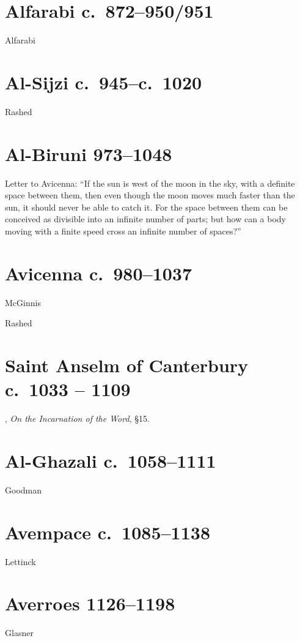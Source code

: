 \documentclass{article}
\begin{document}
\section{Alfarabi c.~872--950/951}
Alfarabi \cite[pp.~101--111]{alfarabi}


\section{Al-Sijzi c.~945--c.~1020}
Rashed \cite{rashed2000}

\section{Al-Biruni 973--1048}
Letter to Avicenna: ``If the sun is west of the moon in the sky, with a definite space between
them, then even though the moon moves much faster than the sun, it should never be able to catch it.
For the space between them can be conceived as divisible into an infinite number of parts; but how
can a body moving with a finite speed cross an infinite number of spaces?'' \cite[p.~820]{selin}

\section{Avicenna c.~980--1037}
McGinnis \cite{mcginnis}

Rashed \cite{rashed}



\section{Saint Anselm of Canterbury c.~1033 -- 1109},
{\em On the Incarnation of the Word}, \S 15.


\section{Al-Ghazali c.~1058--1111}
Goodman \cite{goodman}


\section{Avempace c.~1085--1138}
Lettinck \cite{lettinck}



\section{Averroes 1126--1198}
Glasner \cite{glasner}
\end{document}
